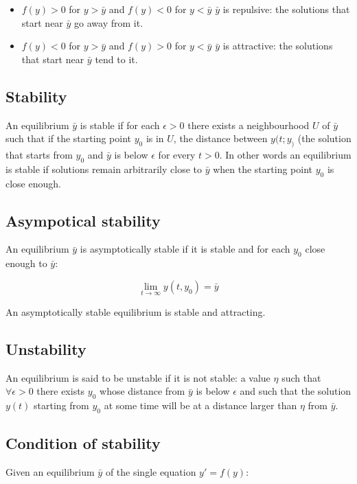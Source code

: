 \begin{multicols}{2}
	\begin{itemize}
		\item $f(y)>0$ for $y>\bar{y}$ and $f(y)<0$ for $y<\bar{y}$ $\bar{y}$ is repulsive: the solutions that start near $\bar{y}$ go away from it.
		\item $f(y)<0$ for $y>\bar{y}$ and $f(y)>0$ for $y<\bar{y}$ $\bar{y}$ is attractive: the solutions that start near $\bar{y}$ tend to it.
	\end{itemize}
\end{multicols}

	\subsection{Stability}
	An equilibrium $\bar{y}$ is stable if for each $\epsilon>0$ there exists a neighbourhood $U$ of $\bar{y}$ such that if the starting point $y_0$ is in $U$, the distance between $y(t;y_)$ (the solution that starts from $y_0$ and $\bar{y}$ is below $\epsilon$ for every $t>0$.
	In other words an equilibrium is stable if solutions remain arbitrarily close to $\bar{y}$ when the starting point $y_0$ is close enough.

	\subsection{Asympotical stability}
	An equilibrium $\bar{y}$ is asymptotically stable if it is stable and for each $y_0$ close enough to $\bar{y}$:

	$$\lim\limits_{t\rightarrow\infty}y(t,y_0) = \bar{y}$$

	An asymptotically stable equilibrium is stable and attracting.

	\subsection{Unstability}
	An equilibrium is said to be unstable if it is not stable: a value $\eta$ such that $\forall\epsilon>0$ there exists $y_0$ whose distance from $\bar{y}$ is below $\epsilon$ and such that the solution $y(t)$ starting from $y_0$ at some time will be at a distance larger than $\eta$ from $\bar{y}$.

	\subsection{Condition of stability}
	Given an equilibrium $\bar{y}$ of the single equation $y'=f(y)$:

